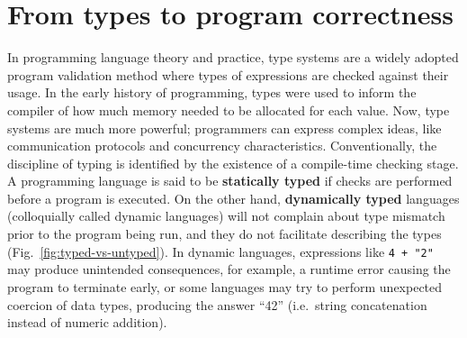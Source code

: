 


\section{From types to program correctness}
\label{sec:typing}
In programming language theory and practice, type systems are a widely adopted program validation method where types of expressions are checked against their usage. In the early history of programming, types were used to inform the compiler of how much memory needed to be allocated for each value. Now, type systems are much more powerful; programmers can express complex ideas, like communication protocols and concurrency characteristics. Conventionally, the discipline of typing is identified by the existence of a compile-time checking stage. A programming language is said to be \textbf{statically typed} if checks are performed before a program is executed.  On the other hand, \textbf{dynamically typed} languages (colloquially called dynamic languages) will not complain about type mismatch prior to the program being run, and they do not facilitate describing the types (Fig.\ \ref{fig:typed-vs-untyped}). In dynamic languages, expressions like \texttt{4 + "2"} may produce unintended consequences, for example, a runtime error causing the program to terminate early, or some languages may try to perform unexpected coercion of data types, producing the answer ``42'' (i.e.\ string concatenation instead of numeric addition). 


